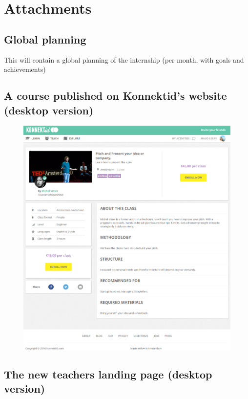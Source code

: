 \section{Attachments}
\label{sec:attach}

\subsection{Global planning}
\label{ssec:planning}

This will contain a global planning of the internship (per month, with goals and achievements)

\newpage

\subsection{A course published on Konnektid's website (desktop version)}
\label{ssec:courseDesktop}

\begin{figure}[H]
    \centering
    \includegraphics[scale=0.6]{figure/coursePage.png}
\end{figure}

\subsection{The new teachers landing page (desktop version)}
\label{ssec:teachersPage}

